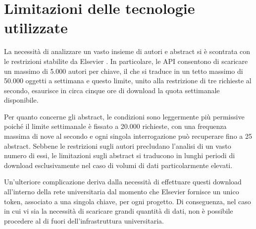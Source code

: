 \section{Limitazioni delle tecnologie utilizzate}
La necessità di analizzare un vasto insieme di autori e abstract si è scontrata con le restrizioni stabilite da Elsevier \cite{scopus-key-settings}. In particolare, le API consentono di scaricare un massimo di 5.000 autori per chiave, il che si traduce in un tetto massimo di 50.000 oggetti a settimana e questo limite, unito alla restrizione di tre richieste al secondo, esaurisce in circa cinque ore di download la quota settimanale disponibile.

Per quanto concerne gli abstract, le condizioni sono leggermente più permissive poiché il limite settimanale è fissato a 20.000 richieste, con una frequenza massima di nove al secondo e ogni singola interrogazione può recuperare fino a 25 abstract. Sebbene le restrizioni sugli autori precludano l'analisi di un vasto numero di essi, le limitazioni sugli abstract si traducono in lunghi periodi di download esclusivamente nel caso di volumi di dati particolarmente elevati.

Un'ulteriore complicazione deriva dalla necessità di effettuare questi download all'interno della rete universitaria dal momento che Elsevier fornisce un unico token, associato a una singola chiave, per ogni progetto. Di conseguenza, nel caso in cui vi sia la necessità di scaricare grandi quantità di dati, non è possibile procedere al di fuori dell'infrastruttura universitaria.